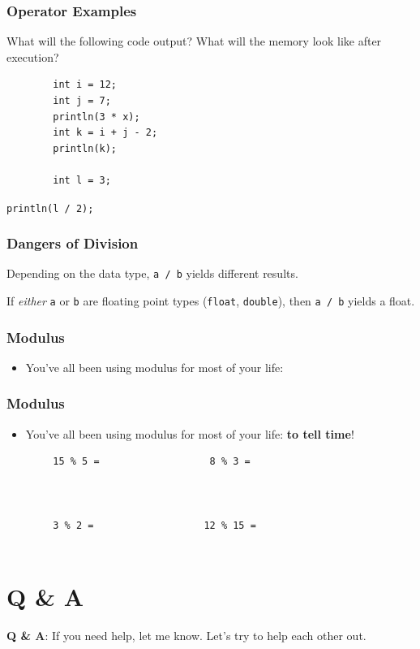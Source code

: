 \documentclass{beamer}
\begin{document}
\begin{frame}[fragile]
    \frametitle{Operator Examples}

    What will the following code output? What will the memory look like after execution?
    \begin{verbatim}
        int i = 12;
        int j = 7;
        println(3 * x);
        int k = i + j - 2;
        println(k);

        int l = 3;
    \end{verbatim}
     {\hspace{1.5cm} \texttt{println(l / 2);}}
\end{frame}

\begin{frame}
    \frametitle{Dangers of Division}

    \begin{itemize}
        \item Depending on the data type, \texttt{a / b} yields different results.
         {
            \item If \textit{either} \texttt{a} or \texttt{b} are floating point types (\texttt{float}, \texttt{double}), then \texttt{a / b} yields a float. 
        }
    \end{itemize}
\end{frame}

\begin{frame}[fragile]
    \frametitle{Modulus}

    \begin{itemize}
        \item You've all been using modulus for most of your life: 
    \end{itemize}

\end{frame}

\begin{frame}[fragile]
    \frametitle{Modulus}

    \begin{itemize}
        \item You've all been using modulus for most of your life: \textbf{to tell time}!
    \end{itemize}

    \begin{verbatim}
        15 % 5 =                   8 % 3 =


        
        3 % 2 =                   12 % 15 =


\end{verbatim}

\end{frame}

\section{Q \& A}
\begin{frame}
    \centering \textbf{Q \& A}: If you need help, let me know. Let’s try to help each other out.
\end{frame}
\end{document}

